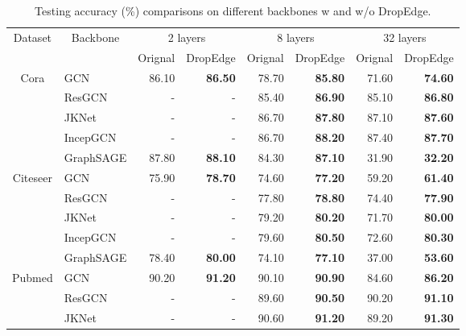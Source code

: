 \documentclass{article}
\begin{document}
\begin{table}[htbp]
  \centering
  \caption{Testing accuracy (\%) comparisons on different backbones w and w/o DropEdge.}
    \vspace{-2ex}
    \small
    \begin{tabular}{rl|rr|rr|rr}
    \hline
    \multicolumn{1}{c}{\multirow{2}[4]{*}{Dataset}} & \multicolumn{1}{c|}{\multirow{2}[4]{*}{Backbone}} & \multicolumn{2}{c|}{2 layers} & \multicolumn{2}{c|}{8 layers} & \multicolumn{2}{c}{32 layers} \\
\cline{3-8}          &       & \multicolumn{1}{c}{Orignal} & \multicolumn{1}{c|}{DropEdge} & \multicolumn{1}{c}{Orignal} & \multicolumn{1}{c|}{DropEdge} & \multicolumn{1}{c}{Orignal} & \multicolumn{1}{c}{DropEdge} \\
    \hline
    \multicolumn{1}{c}{\multirow{5}[2]{*}{Cora}} & GCN   & 86.10 & \textbf{86.50} & 78.70 & \textbf{85.80} & 71.60 & \textbf{74.60} \\
          & ResGCN & -     & -     & 85.40 & \textbf{86.90} & 85.10 & \textbf{86.80} \\
          & JKNet & -     & -     & 86.70 & \textbf{87.80} & 87.10 & \textbf{87.60} \\
          & IncepGCN & -     & -     & 86.70 & \textbf{88.20} & 87.40 & \textbf{87.70} \\
          & GraphSAGE & 87.80 & \textbf{88.10} & 84.30 & \textbf{87.10} & 31.90 & \textbf{32.20} \\
    \hline
    \multicolumn{1}{c}{\multirow{5}[2]{*}{Citeseer}} & GCN   & 75.90 & \textbf{78.70} & 74.60 & \textbf{77.20} & 59.20 & \textbf{61.40} \\
          & ResGCN & -     & -     & 77.80 & \textbf{78.80} & 74.40 & \textbf{77.90} \\
          & JKNet & -     & -     & 79.20 & \textbf{80.20} & 71.70 & \textbf{80.00} \\
          & IncepGCN & -     & -     & 79.60 & \textbf{80.50} & 72.60 & \textbf{80.30} \\
          & GraphSAGE & 78.40 & \textbf{80.00} & 74.10 & \textbf{77.10} & 37.00 & \textbf{53.60} \\
    \hline
    \multicolumn{1}{c}{\multirow{5}[2]{*}{Pubmed}} & GCN   & 90.20 & \textbf{91.20} & 90.10 & \textbf{90.90} & 84.60 & \textbf{86.20} \\
          & ResGCN & -     & -     & 89.60 & \textbf{90.50} & 90.20 & \textbf{91.10} \\
          & JKNet & -     & -     & 90.60 & \textbf{91.20} & 89.20 & \textbf{91.30} \\

\end{tabular}
\end{table}
\end{document}
